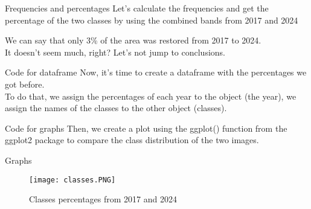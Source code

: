 \documentclass{beamer}
\begin{document}
\begin{frame}{Frequencies and percentages}
    Let's calculate the frequencies and get the percentage of the two classes by using the combined bands from 2017 and 2024
   
    

    We can say that only 3\% of the area was restored from 2017 to 2024.
    \\ It doesn't seem much, right? Let's not jump to conclusions.
\end{frame}

\begin{frame}{Code for dataframe}
    Now, it's time to create a dataframe with the percentages we got before. \\ To do that, we assign the percentages of each year to the object (the year), we assign the names of the classes to the other object (classes).
  
  

\end{frame}

\begin{frame}{Code for graphs}
    Then, we create a plot using the ggplot() function from the ggplot2 package to compare the class distribution of the two images.
    
     

\end{frame}

\begin{frame}{Graphs} 
\begin{figure}
    \centering
    \texttt{[image: classes.PNG]}
    \caption{Classes percentages from 2017 and 2024}
    \label{fig:enter-label}
\end{figure}
\end{frame}
\end{document}
